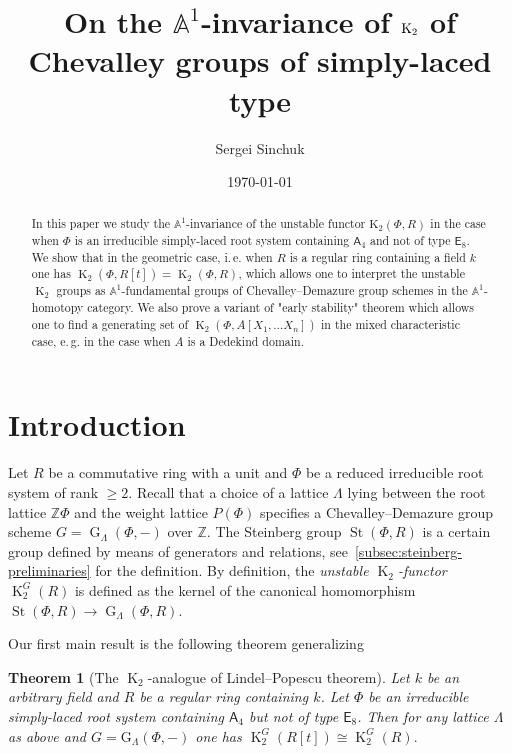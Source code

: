 \documentclass[oneside, 10pt]{amsart}
\title{On the $\mathbb{A}^1$-invariance of $\K_2$ of Chevalley groups of simply-laced type}
\author {Sergei Sinchuk}
\date {\today}
\DeclareMathOperator{\St}{St}
\DeclareMathOperator{\G}{G}
\DeclareMathOperator{\K}{K}
\newcommand{\rA}{\mathsf{A}}
\newcommand{\rE}{\mathsf{E}}
\newcommand{\ZZ}{\mathbb{Z}}
\newtheorem{thm}{Theorem}
\numberwithin{equation}{section}
\numberwithin{thm}{section}
\numberwithin{lemma}{section}
\theoremstyle{definition}
\theoremstyle{remark}
\begin{document}
    \maketitle


\begin{abstract}
In this paper we study the $\mathbb{A}^1$-invariance of the unstable functor $\mathrm{K}_2(\Phi, R)$
in the case when $\Phi$ is an irreducible simply-laced root system containing $\rA_4$ and not of type $\rE_8$.
We show that in the geometric case, i.\,e. when $R$ is a regular ring containing a field $k$
one has $\K_2(\Phi, R[t]) = \K_2(\Phi, R)$, which allows one to interpret the unstable $\K_2$ groups
as $\mathbb{A}^1$-fundamental groups of Chevalley--Demazure group schemes in the $\mathbb{A}^1$-homotopy category.
We also prove a variant of "early stability" theorem which allows one to find a generating set
of $\K_2(\Phi, A[X_1, \ldots X_n])$ in the mixed characteristic case, e.\,g. in the case when $A$ is a Dedekind domain.
\end{abstract}

\section{Introduction}\label{sec:introduction}

Let $R$ be a commutative ring with a unit and $\Phi$ be a reduced irreducible root system of rank $\geq 2$.
Recall that a choice of a lattice $\Lambda$ lying between the root lattice $\mathbb{Z}\Phi$ and the weight lattice $P(\Phi)$
 specifies a Chevalley--Demazure group scheme $G=\G_\Lambda(\Phi, -)$ over $\ZZ$.
The Steinberg group $\St(\Phi, R)$ is a certain group defined by means of generators and relations, see~\cref{subsec:steinberg-preliminaries} for the definition.
By definition, the \textit{unstable $\K_2$-functor} $\K_2^G(R)$ is defined as the kernel of the canonical homomorphism $\St(\Phi, R) \to \G_\Lambda(\Phi, R)$.

Our first main result is the following theorem generalizing~\cite[Theorem~1.1]{LSV2}
\begin{thm}[The $\K_2$-analogue of Lindel--Popescu theorem] \label{thm:LP-for-K2}
 Let $k$ be an arbitrary field and $R$ be a regular ring containing $k$.
 Let $\Phi$ be an irreducible simply-laced root system containing $\rA_4$ but not of type $\rE_8$.
 Then for any lattice $\Lambda$ as above and $G = \mathrm{G}_\Lambda(\Phi, -)$ one has
 $\K_2^G(R[t])\cong\K_2^G(R).$
\end{thm}
\end{document}
